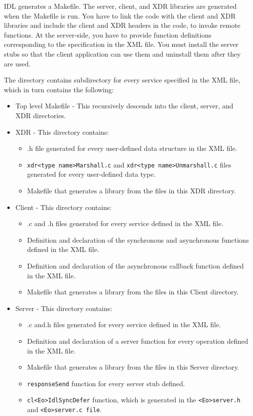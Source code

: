 \begin{flushleft}
IDL generates a Makefile. The server, client, and XDR libraries are generated when the Makefile is run. You have to link the code with the client 
and XDR libraries and include the client and XDR headers in the code, to invoke remote functions. At the server-side, you have to provide function 
definitions corresponding to the specification in the XML file. You must install the server stubs so that the client application can use them and 
uninstall them after they are used. 
\par
The directory contains subdirectory for every service specified in the XML file, which in turn contains the following:
\begin{itemize}
\item
Top level Makefile - This recursively descends into the client, server, and XDR directories.
\item
XDR - This directory contains:
\begin{itemize}
\item
.h file generated for every user-defined data structure in the XML file. 
\item
{\tt{xdr<type name>Marshall.c}} and {\tt{xdr<type name>Unmarshall.c}} files generated for every user-defined data type. 
\item
Makefile that generates a library from the files in this XDR directory.
\end{itemize}
\item
Client - 
This directory contains:
\begin{itemize}
\item
.c and .h files generated for every service defined in the XML file.
\item
Definition and declaration of the synchronous and asynchronous functions defined in the XML file.
\item
Definition and declaration of the asynchronous callback function defined in the XML file.
\item
Makefile that generates a library from the files in this Client directory.
\end{itemize}
\item
Server - This directory contains:

\begin{itemize}
\item
.c and.h files generated for every service defined in the XML file. 
\item
Definition and declaration of a server function for every operation defined in the XML file. 
\item
Makefile that generates a library from the files in this Server directory.
\item
{\tt{responseSend}} function for every server stub defined.
\item
{\tt{cl<Eo>IdlSyncDefer}} function, which is generated in the {\tt{<Eo>server.h}} and {\tt{<Eo>server.c file}}.
\end{itemize}

\end{itemize}
\end{flushleft}


